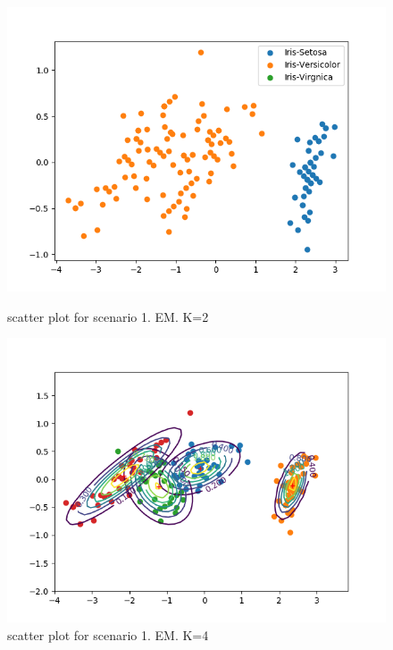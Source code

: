 \documentclass[a4paper]{article}
\begin{document}
          \clearpage
          \begin{figure}[h!]
            \centering
            \begin{minipage}[t]{6.5cm}
              \includegraphics[width=1.0\textwidth]{pca_em_s1_2.png}
              \caption{scatter plot for scenario 1. EM. K=2}
            \end{minipage}
            \hspace{2cm}
            \begin{minipage}[t]{6.5cm}
              \includegraphics[width=1.0\textwidth]{pca_em_s1_4.png}
              \caption{scatter plot for scenario 1. EM. K=4}
            \end{minipage}
            \begin{minipage}[t]{6.5cm}

\end{minipage}
\end{figure}
\end{document}
